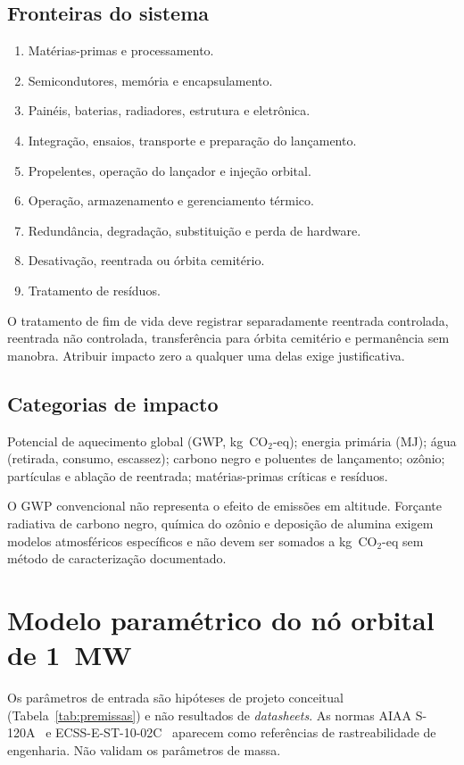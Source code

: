 \documentclass[11pt,a4paper]{article}
\newcommand{\COeq}{\ensuremath{\mathrm{CO_2}\text{-eq}}}
\begin{document}
\subsection{Fronteiras do sistema}
\begin{enumerate}
  \item Matérias-primas e processamento.
  \item Semicondutores, memória e encapsulamento.
  \item Painéis, baterias, radiadores, estrutura e eletrônica.
  \item Integração, ensaios, transporte e preparação do lançamento.
  \item Propelentes, operação do lançador e injeção orbital.
  \item Operação, armazenamento e gerenciamento térmico.
  \item Redundância, degradação, substituição e perda de hardware.
  \item Desativação, reentrada ou órbita cemitério.
  \item Tratamento de resíduos.
\end{enumerate}
O tratamento de fim de vida deve registrar separadamente reentrada controlada,
reentrada não controlada, transferência para órbita cemitério e permanência sem
manobra. Atribuir impacto zero a qualquer uma delas exige justificativa.

\subsection{Categorias de impacto}

Potencial de aquecimento global (GWP, kg~$\COeq$); energia primária (MJ); água
(retirada, consumo, escassez); carbono negro e poluentes de lançamento; ozônio;
partículas e ablação de reentrada; matérias-primas críticas e resíduos.

O GWP convencional não representa o efeito de emissões em altitude. Forçante
radiativa de carbono negro, química do ozônio e deposição de alumina exigem
modelos atmosféricos específicos e não devem ser somados a kg~$\COeq$ sem
método de caracterização documentado.

\section{Modelo paramétrico do nó orbital de 1~MW}

Os parâmetros de entrada são hipóteses de projeto conceitual
(Tabela~\ref{tab:premissas}) e não resultados de \emph{datasheets}. As normas
AIAA S-120A~\cite{r3} e ECSS-E-ST-10-02C~\cite{r4} aparecem como referências de
rastreabilidade de engenharia. Não validam os parâmetros de massa.
\end{document}
